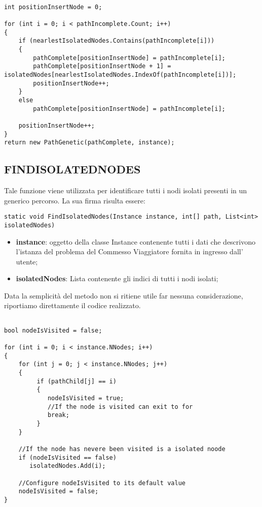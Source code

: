 \documentclass[11pt]{article}
\begin{document}
\begin{lstlisting}

int positionInsertNode = 0;

for (int i = 0; i < pathIncomplete.Count; i++)
{
    if (nearlestIsolatedNodes.Contains(pathIncomplete[i]))
    {
        pathComplete[positionInsertNode] = pathIncomplete[i];
        pathComplete[positionInsertNode + 1] = isolatedNodes[nearlestIsolatedNodes.IndexOf(pathIncomplete[i])];
        positionInsertNode++;
    }
    else
        pathComplete[positionInsertNode] = pathIncomplete[i];

    positionInsertNode++;
}
return new PathGenetic(pathComplete, instance);
\end{lstlisting}

\subsection*{FINDISOLATEDNODES}

Tale funzione viene utilizzata per identificare tutti i nodi isolati presenti in un generico percorso.
La sua firma risulta essere:

\begin{lstlisting}
static void FindIsolatedNodes(Instance instance, int[] path, List<int> isolatedNodes)
\end{lstlisting}

\begin{itemize}
    \item \textbf{instance}: oggetto della classe Instance contenente tutti i dati che descrivono l'istanza del problema del Commesso Viaggiatore fornita in ingresso dall' utente;
    \item \textbf{isolatedNodes}: Lista contenente gli indici di tutti i nodi isolati;
\end{itemize}

Data la semplicità del metodo non si ritiene utile far nessuna considerazione, riportiamo direttamente il codice realizzato.

\begin{lstlisting}

bool nodeIsVisited = false;

for (int i = 0; i < instance.NNodes; i++)
{
    for (int j = 0; j < instance.NNodes; j++)
    {
         if (pathChild[j] == i)
         {
            nodeIsVisited = true;
            //If the node is visited can exit to for
            break;
         }
    }

    //If the node has nevere been visited is a isolated noode
    if (nodeIsVisited == false)
       isolatedNodes.Add(i);

    //Configure nodeIsVisited to its default value
    nodeIsVisited = false;
}

\end{lstlisting}
\end{document}
